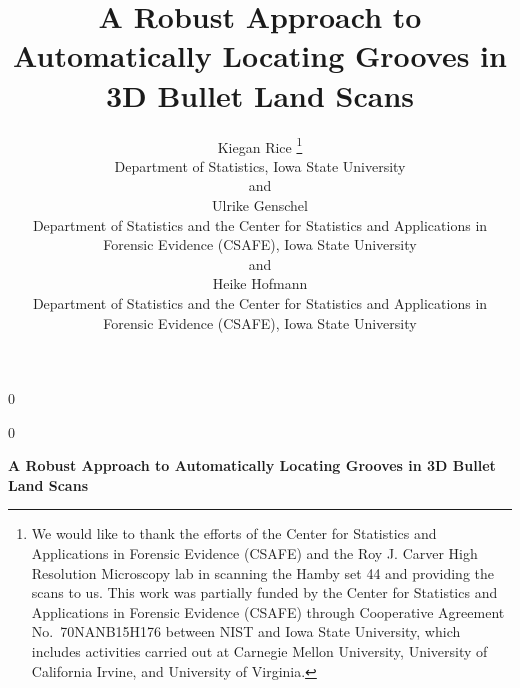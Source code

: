 \documentclass[12pt]{article}
\newcommand{\blind}{0}
\begin{document}
\def\spacingset#1{\renewcommand{\baselinestretch}%
{#1}\small\normalsize} \spacingset{1}




\blind
{
  \title{\bf A Robust Approach to Automatically Locating Grooves in 3D Bullet Land
Scans}

  \author{
        Kiegan Rice \thanks{We would like to thank the efforts of the Center for Statistics and
Applications in Forensic Evidence (CSAFE) and the Roy J. Carver High
Resolution Microscopy lab in scanning the Hamby set 44 and providing the
scans to us. This work was partially funded by the Center for Statistics
and Applications in Forensic Evidence (CSAFE) through Cooperative
Agreement No.~70NANB15H176 between NIST and Iowa State University, which
includes activities carried out at Carnegie Mellon University,
University of California Irvine, and University of Virginia.} \\
    Department of Statistics, Iowa State University\\
     and \\     Ulrike Genschel \\
    Department of Statistics and the Center for Statistics and Applications
    in Forensic Evidence (CSAFE), Iowa State University\\
     and \\     Heike Hofmann \\
    Department of Statistics and the Center for Statistics and Applications
    in Forensic Evidence (CSAFE), Iowa State University\\
      }
  \maketitle
} \fi

\blind
{
  \bigskip
  \bigskip
  \bigskip
  \begin{center}
    {\LARGE\bf A Robust Approach to Automatically Locating Grooves in 3D Bullet Land
Scans}
  \end{center}
  \medskip
} \fi
\end{document}
